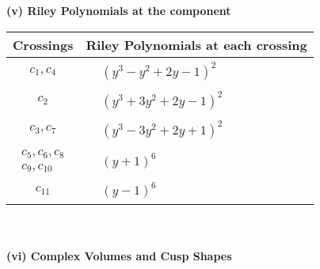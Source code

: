\documentclass[1p]{elsarticle_modified}
\theoremstyle{definition}
\begin{document}
\newpage\renewcommand{\arraystretch}{1}
\flushleft \textbf{(v) Riley Polynomials at the component}\newline \\
\begin{tabular}{m{50pt}|m{274pt}}
Crossings & \hspace{64pt}Riley Polynomials at each crossing \\
\hline $$\begin{aligned}c_{1},c_{4}\end{aligned}$$&$\begin{aligned}
&(y^3- y^2+2 y-1)^2
\end{aligned}$\\
\hline $$\begin{aligned}c_{2}\end{aligned}$$&$\begin{aligned}
&(y^3+3 y^2+2 y-1)^2
\end{aligned}$\\
\hline $$\begin{aligned}c_{3},c_{7}\end{aligned}$$&$\begin{aligned}
&(y^3-3 y^2+2 y+1)^2
\end{aligned}$\\
\hline $$\begin{aligned}c_{5},c_{6},c_{8}\\c_{9},c_{10}\end{aligned}$$&$\begin{aligned}
&(y+1)^6
\end{aligned}$\\
\hline $$\begin{aligned}c_{11}\end{aligned}$$&$\begin{aligned}
&(y-1)^6
\end{aligned}$\\
\hline
\end{tabular}\\~\\
\newpage\flushleft \textbf{(vi) Complex Volumes and Cusp Shapes}
\end{document}
